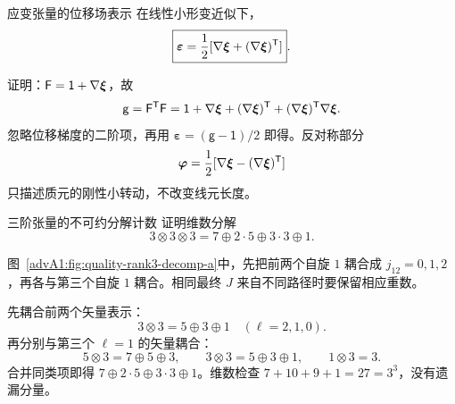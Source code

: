 \begin{advtheorem}{应变张量的位移场表示}\label{advA1:thm:strain-displacement}
在线性小形变近似下，
\[
 \boxed{\bm\varepsilon=\frac12[
 \nabla\bm{\xi}+(\nabla\bm{\xi})^{\mathsf T}]}.
\]
\end{advtheorem}
证明：$\mathsf F=\mathsf1+\nabla\bm{\xi}$，故
\[
 \mathsf g=\mathsf F^{\mathsf T}\mathsf F
 =\mathsf1+\nabla\bm{\xi}+(\nabla\bm{\xi})^{\mathsf T}
 +(\nabla\bm{\xi})^{\mathsf T}\nabla\bm{\xi}.
\]
忽略位移梯度的二阶项，再用
$\bm\varepsilon=(\mathsf g-\mathsf1)/2$ 即得。反对称部分
\[
 \bm\varphi=\frac12[
 \nabla\bm{\xi}-(\nabla\bm{\xi})^{\mathsf T}]
\]
只描述质元的刚性小转动，不改变线元长度。


\begin{advexamplebox}{三阶张量的不可约分解计数}\label{advA1:ex:rank3-decomp}
证明维数分解
\[
 3\otimes3\otimes3=7\oplus2\cdot5\oplus3\cdot3\oplus1.
\]

\begin{qualityfigure}
\label{advA1:fig:quality-rank3-decomp-q}
\end{qualityfigure}
\end{advexamplebox}
\begin{advsolution}
\begin{qualityfigure}
\label{advA1:fig:quality-rank3-decomp-a}
\end{qualityfigure}
图~\ref{advA1:fig:quality-rank3-decomp-a}中，先把前两个自旋 $1$ 耦合成 $j_{12}=0,1,2$，再各与第三个自旋 $1$ 耦合。相同最终 $J$ 来自不同路径时要保留相应重数。

先耦合前两个矢量表示：
\[
 3\otimes3=5\oplus3\oplus1
 \quad(\ell=2,1,0).
\]
再分别与第三个 $\ell=1$ 的矢量耦合：
\[
 5\otimes3=7\oplus5\oplus3,\qquad
 3\otimes3=5\oplus3\oplus1,\qquad
 1\otimes3=3.
\]
合并同类项即得
$7\oplus2\cdot5\oplus3\cdot3\oplus1$。维数检查
$7+10+9+1=27=3^3$，没有遗漏分量。
\end{advsolution}

\AOneElasticSecond
\AOneFluidSection
